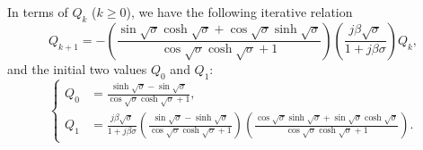 \documentclass{article}
\begin{document}
In terms of $Q_k$ ($k \geq 0$), we have the following iterative relation
\begin{equation}
    Q_{k+1} = - \left( \frac{ \sin\sqrt{\sigma} \cosh\sqrt{\sigma} + \cos\sqrt{\sigma} \sinh\sqrt{\sigma} }{ \cos\sqrt{\sigma }\cosh\sqrt{\sigma }+1 } \right) \left( \frac{j \beta \sqrt{\sigma }}{1+j \beta \sigma } \right) Q_k,
\end{equation}
and the initial two values $Q_0$ and $Q_1$:
\begin{equation}
    \left\{\begin{aligned}
        Q_0 &= \frac{\sinh\sqrt{\sigma }-\sin\sqrt{\sigma }}{\cos\sqrt{\sigma } \cosh\sqrt{\sigma }+1}, \\
        Q_{1} &= \frac{j \beta  \sqrt{\sigma }}{1+j \beta  \sigma } \left(\frac{\sin\sqrt{\sigma } -\sinh\sqrt{\sigma }}{\cos\sqrt{\sigma } \cosh\sqrt{\sigma }+1} \right)  \left( \frac{\cos\sqrt{\sigma } \sinh\sqrt{\sigma }+\sin\sqrt{\sigma } \cosh\sqrt{\sigma }}{\cos\sqrt{\sigma } \cosh\sqrt{\sigma }+1} \right).
    \end{aligned}\right.
\end{equation}
\end{document}

